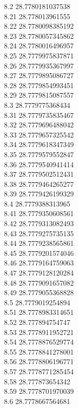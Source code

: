 {8.2	28.7780181037538\\
8.21	28.778013961555\\
8.22	28.7780098385192\\
8.23	28.7780057345862\\
8.24	28.7780016496957\\
8.25	28.7779975837871\\
8.26	28.7779935367997\\
8.27	28.7779895086727\\
8.28	28.7779854993451\\
8.29	28.7779815087557\\
8.3	28.7779775368434\\
8.31	28.7779735835467\\
8.32	28.7779696488042\\
8.33	28.7779657325542\\
8.34	28.7779618347349\\
8.35	28.7779579552847\\
8.36	28.7779540941414\\
8.37	28.7779502512431\\
8.38	28.7779464265277\\
8.39	28.7779426199329\\
8.4	28.7779388313965\\
8.41	28.7779350608561\\
8.42	28.7779313082493\\
8.43	28.7779275735135\\
8.44	28.7779238565861\\
8.45	28.7779201574046\\
8.46	28.7779164759063\\
8.47	28.7779128120284\\
8.48	28.7779091657082\\
8.49	28.7779055368828\\
8.5	28.7779019254894\\
8.51	28.7778983314651\\
8.52	28.777894754747\\
8.53	28.7778911952721\\
8.54	28.7778876529774\\
8.55	28.7778841278001\\
8.56	28.7778806196771\\
8.57	28.7778771285454\\
8.58	28.777873654342\\
8.59	28.7778701970039\\
8.6	28.7778667564681\\
}
